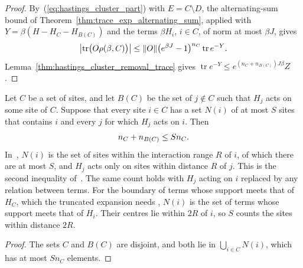 \begin{proof}
    \leanok
    By~(\ref{eq:hastings_cluster_part}) with $E=C\setminus D$, the alternating-sum
    bound of Theorem~\ref{thm:trace_exp_alternating_sum},
    applied with $Y=\beta(H-H_C-H_{B(C)})$ and the terms $\beta H_i$, $i\in C$, of
    norm at most $\beta J$, gives
    \begin{align}
        \left|\operatorname{tr}\bigl(O\rho(\beta,C)\bigr)\right|
        \le\|O\|\bigl(e^{\beta J}-1\bigr)^{n_C}\operatorname{tr}e^{-Y}.\notag
    \end{align}
    Lemma~\ref{thm:hastings_cluster_removal_trace} gives
    $\operatorname{tr}e^{-Y}\le e^{(n_C+n_{B(C)})J\beta}Z$.
\end{proof}

\begin{lemma}
    \label{thm:hastings_cluster_boundary_count}
    \leanok
    Let $C$ be a set of sites, and let $B(C)$ be the set of $j\notin C$ such
    that $H_j$ acts on some site of $C$. Suppose that every site $i\in C$ has a
    set $N(i)$ of at most $S$ sites that contains $i$ and every $j$ for which
    $H_j$ acts on $i$. Then
    \begin{align}
        n_C+n_{B(C)}\le Sn_C.\notag
    \end{align}
    In~\cite[lines 181--183]{Hastings2006Solving}, $N(i)$ is the set of sites
    within the interaction range $R$ of $i$, of which there are at most $S$,
    and $H_j$ acts only on sites within distance $R$ of $j$. This is the second
    inequality of~\cite[line 1186]{Hastings2006Solving}. The same count holds
    with $H_j$ acting on $i$ replaced by any relation between terms. For the
    boundary of terms whose support meets that of $H_C$, which the truncated
    expansion needs \cite{gap:hastings05_cluster_boundary}, $N(i)$ is the set
    of terms whose support meets that of $H_i$. Their centres lie within $2R$
    of $i$, so $S$ counts the sites within distance $2R$.
\end{lemma}

\begin{proof}
    \leanok
    The sets $C$ and $B(C)$ are disjoint, and both lie in
    $\bigcup_{i\in C}N(i)$, which has at most $Sn_C$ elements.
\end{proof}

